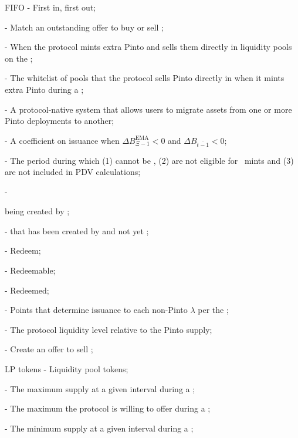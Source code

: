 \documentclass[class=article, crop=false]{standalone}
\begin{document}
\begin{itemize}[topsep=0pt, itemsep=3pt,leftmargin=16pt]
    \item[] FIFO - First in, first out;
    \item[]  - Match an outstanding offer to buy or sell ;
    \item[]  - When the protocol mints extra Pinto and sells them directly in liquidity pools on the ;
    \item[]  - The whitelist of pools that the protocol sells Pinto directly in when it mints extra Pinto during a ;
    \item[]  - A protocol-native system that allows users to migrate assets from one or more Pinto deployments to another;
    \item[]  - A coefficient on  issuance when $\Delta B_{\Xi-1}^{\text{EMA}} < 0$ and $\Delta B_{\overline{t-1}} < 0$;
    \item[]  - The period during which  (1) cannot be , (2) are not eligible for \Pinto\ mints and (3) are not included in  PDV calculations;
    \item[]  - { being created by ;
    \item[]  -  that has been created by  and not yet ;
    \item[]  - Redeem;
    \item[]  - Redeemable;
    \item[]  - Redeemed;
    \item[]  - Points that determine  issuance to each non-Pinto $\lambda$ per the ;
    \item[]  - The protocol liquidity level relative to the Pinto supply;
    \item[]  - Create an offer to sell ;
    \item[] LP tokens - Liquidity pool tokens;
    \item[]  - The maximum  supply at a given interval during a ;
    \item[]  - The maximum  the protocol is willing to offer during a ;
    \item[]  - The minimum  supply at a given interval during a ;
}
\end{itemize}
\end{document}
